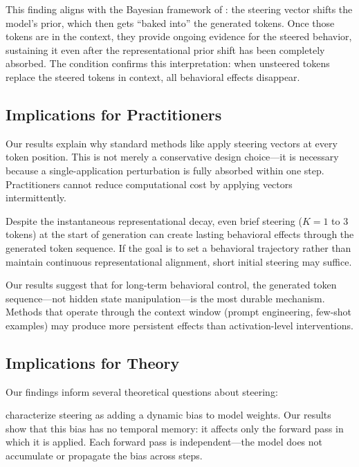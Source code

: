 This finding aligns with the Bayesian framework of \citet{bigelow2025belief}:
the steering vector shifts the model's prior, which then gets ``baked into'' the
generated tokens. Once those tokens are in the context, they provide ongoing
evidence for the steered behavior, sustaining it even after the representational
prior shift has been completely absorbed. The \TFclean condition confirms this
interpretation: when unsteered tokens replace the steered tokens in context,
all behavioral effects disappear.

\subsection{Implications for Practitioners}

Our results explain why standard methods like \caa apply steering vectors at
every token position. This is not merely a conservative design choice---it is
necessary because a single-application perturbation is fully absorbed within one
step. Practitioners cannot reduce computational cost by applying vectors
intermittently.

Despite the instantaneous representational decay, even brief steering ($K = 1$
to $3$ tokens) at the start of generation can create lasting behavioral effects
through the generated token sequence. If the goal is to set a behavioral
trajectory rather than maintain continuous representational alignment, short
initial steering may suffice.

Our results suggest that for long-term behavioral control, the generated token
sequence---not hidden state manipulation---is the most durable mechanism.
Methods that operate through the context window (\eg prompt engineering, few-shot
examples) may produce more persistent effects than activation-level
interventions.

\subsection{Implications for Theory}

Our findings inform several theoretical questions about steering:

\citet{xu2026why} characterize steering as adding a dynamic bias to model
weights. Our results show that this bias has no temporal memory: it affects
only the forward pass in which it is applied. Each forward pass is
independent---the model does not accumulate or propagate the bias across steps.

